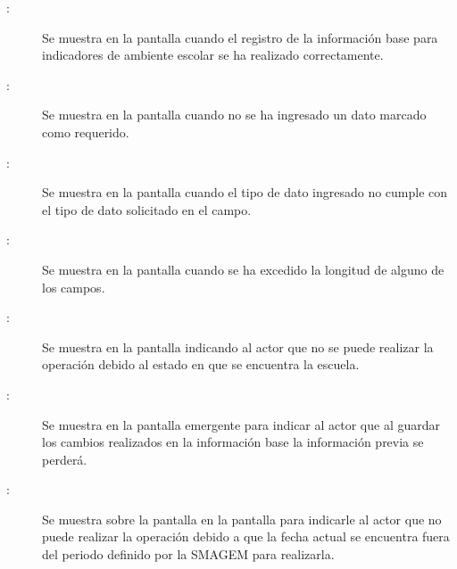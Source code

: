     \begin{description}
      
	    \item [:] Se muestra en la pantalla  cuando el registro de la información base para indicadores de ambiente escolar se ha realizado correctamente.
	    
	    \item [:] Se muestra en la pantalla  cuando no se ha ingresado un dato marcado como requerido.
	    
	    \item [:] Se muestra en la pantalla  cuando el tipo de dato ingresado no cumple con el tipo de dato solicitado en el campo.
	    
	    \item [:] Se muestra en la pantalla  cuando se ha excedido la longitud de alguno de los campos.	    
	    
	    \item[:] Se muestra en la pantalla  indicando al actor que no se puede realizar la operación debido al estado en que se encuentra la escuela.
	    
	    \item [:] Se muestra en la pantalla emergente  para indicar al actor que al guardar los cambios realizados en la información base la información previa se perderá.
	    
	    \item [:] Se muestra sobre la pantalla en la pantalla  para indicarle al actor que no puede realizar la operación debido a que la fecha actual se encuentra fuera del periodo definido por la SMAGEM para realizarla.
    \end{description}
